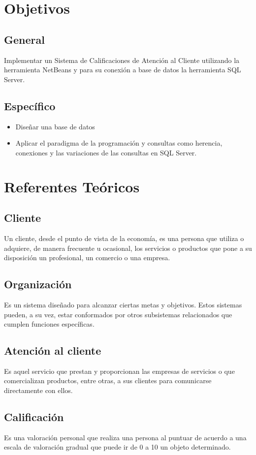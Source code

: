 \documentclass[preprint,12pt]{elsarticle}
\begin{document}
\section{Objetivos}
	\subsection{General }	
		Implementar un Sistema de Calificaciones de Atención al Cliente utilizando la herramienta NetBeans y para su conexión a base de datos la herramienta SQL Server.
	\subsection{Específico }	

\begin{itemize}
	\item Diseñar una base de datos
	\item Aplicar el paradigma  de la programación y consultas como herencia, conexiones y las variaciones de las consultas en SQL Server.
\end{itemize}


\section{Referentes Teóricos}
\subsection{Cliente}
Un cliente, desde el punto de vista de la economía, es una persona que utiliza o adquiere, de manera frecuente u ocasional, los servicios o productos que pone a su disposición un profesional, un comercio o una empresa.
\subsection{Organización}
Es un sistema diseñado para alcanzar ciertas metas y objetivos. Estos sistemas pueden, a su vez, estar conformados por otros subsistemas relacionados que cumplen funciones específicas.
\subsection{Atención al cliente}
Es aquel servicio que prestan y proporcionan las empresas de servicios o que comercializan productos, entre otras, a sus clientes para comunicarse directamente con ellos.
\subsection{Calificación}
Es una valoración personal que realiza una persona al puntuar de acuerdo a una escala de valoración gradual que puede ir de 0 a 10 un objeto determinado.
\end{document}
